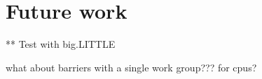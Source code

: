 \chapter{Future work}
\label{cha:future}

** Test with big.LITTLE

what about barriers with a single work group??? for cpus? ~\cite{Rosenberg2011}